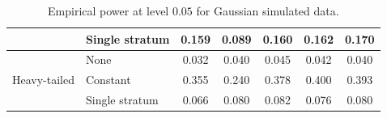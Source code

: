 \documentclass[12pt]{article}
\begin{document}
\begin{table}[]
\begin{tabular}{ll|ccccc}
                              & Single stratum                                              & 0.159                      & 0.089                                                                                & 0.160                                                                                 & 0.162                                                                        & 0.170                                                                        \\ \hline
\multirow{3}{*}{Heavy-tailed} & None                                                        & 0.032                      & 0.040                                                                                & 0.045                                                                                 & 0.042                                                                        & 0.040                                                                        \\
                              & Constant                                                    & 0.355                      & 0.240                                                                                & 0.378                                                                                 & 0.400                                                                        & 0.393                                                                        \\
                              & Single stratum                                              & 0.066                      & 0.080                                                                                & 0.082                                                                                 & 0.076                                                                        & 0.080                                                                        \\ \hline
\end{tabular}
\caption{Empirical power at level $0.05$ for Gaussian simulated data.}
\end{table}
\end{document}
